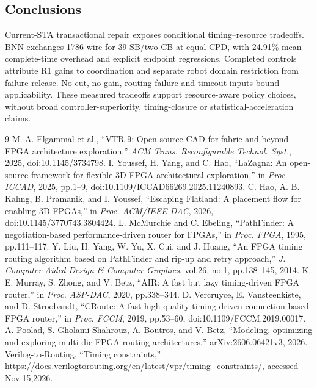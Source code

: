 \documentclass[conference,10pt]{IEEEtran}
\begin{document}
\subsection{Conclusions}
Current-STA transactional repair exposes conditional timing--resource tradeoffs. BNN exchanges 1786 wire for 39 SB/two CB at equal CPD, with 24.91\% mean complete-time overhead and explicit endpoint regressions. Completed controls attribute R1 gains to coordination and separate robot domain restriction from failure release. No-cut, no-gain, routing-failure and timeout inputs bound applicability. These measured tradeoffs support resource-aware policy choices, without broad controller-superiority, timing-closure or statistical-acceleration claims.
\begin{thebibliography}{9}
 M. A. Elgammal et al., ``VTR 9: Open-source CAD for fabric and beyond FPGA architecture exploration,'' \emph{ACM Trans. Reconfigurable Technol. Syst.}, 2025, doi:10.1145/3734798.
 I. Youssef, H. Yang, and C. Hao, ``LaZagna: An open-source framework for flexible 3D FPGA architectural exploration,'' in \emph{Proc. ICCAD}, 2025, pp.1--9, doi:10.1109/ICCAD66269.2025.11240893.
 C. Hao, A. B. Kahng, B. Pramanik, and I. Youssef, ``Escaping Flatland: A placement flow for enabling 3D FPGAs,'' in \emph{Proc. ACM/IEEE DAC}, 2026, doi:10.1145/3770743.3804424.
 L. McMurchie and C. Ebeling, ``PathFinder: A negotiation-based performance-driven router for FPGAs,'' in \emph{Proc. FPGA}, 1995, pp.111--117.
 Y. Liu, H. Yang, W. Yu, X. Cui, and J. Huang, ``An FPGA timing routing algorithm based on PathFinder and rip-up and retry approach,'' \emph{J. Computer-Aided Design \& Computer Graphics}, vol.26, no.1, pp.138--145, 2014.
 K. E. Murray, S. Zhong, and V. Betz, ``AIR: A fast but lazy timing-driven FPGA router,'' in \emph{Proc. ASP-DAC}, 2020, pp.338--344.
 D. Vercruyce, E. Vansteenkiste, and D. Stroobandt, ``CRoute: A fast high-quality timing-driven connection-based FPGA router,'' in \emph{Proc. FCCM}, 2019, pp.53--60, doi:10.1109/FCCM.2019.00017.
 A. Poolad, S. Gholami Shahrouz, A. Boutros, and V. Betz, ``Modeling, optimizing and exploring multi-die FPGA routing architectures,'' arXiv:2606.06421v3, 2026.
 Verilog-to-Routing, ``Timing constraints,'' \url{https://docs.verilogtorouting.org/en/latest/vpr/timing_constraints/}, accessed Nov.15,2026.
\end{thebibliography}
\end{document}
